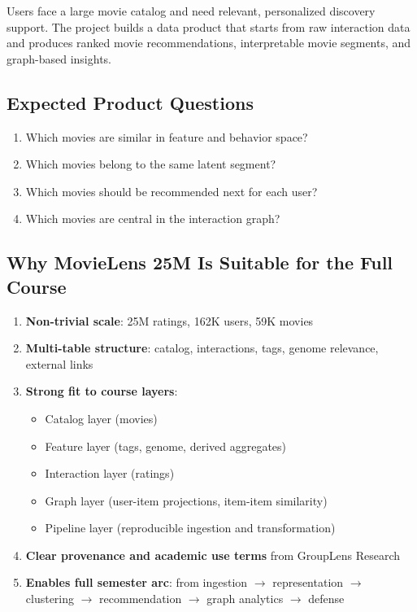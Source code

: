 \documentclass[11pt]{article}
\begin{document}
Users face a large movie catalog and need relevant, personalized discovery support. The project builds a data product that starts from raw interaction data and produces ranked movie recommendations, interpretable movie segments, and graph-based insights.

\subsection{Expected Product Questions}

\begin{enumerate}[leftmargin=1.5em]
    \item Which movies are similar in feature and behavior space?
    \item Which movies belong to the same latent segment?
    \item Which movies should be recommended next for each user?
    \item Which movies are central in the interaction graph?
\end{enumerate}

\subsection{Why MovieLens 25M Is Suitable for the Full Course}

\begin{enumerate}[leftmargin=1.5em]
    \item \textbf{Non-trivial scale}: 25M ratings, 162K users, 59K movies
    \item \textbf{Multi-table structure}: catalog, interactions, tags, genome relevance, external links
    \item \textbf{Strong fit to course layers}:
    \begin{itemize}[leftmargin=1.5em]
        \item Catalog layer (movies)
        \item Feature layer (tags, genome, derived aggregates)
        \item Interaction layer (ratings)
        \item Graph layer (user-item projections, item-item similarity)
        \item Pipeline layer (reproducible ingestion and transformation)
    \end{itemize}
    \item \textbf{Clear provenance and academic use terms} from GroupLens Research
    \item \textbf{Enables full semester arc}: from ingestion $\rightarrow$ representation $\rightarrow$ clustering $\rightarrow$ recommendation $\rightarrow$ graph analytics $\rightarrow$ defense
\end{enumerate}
\end{document}
